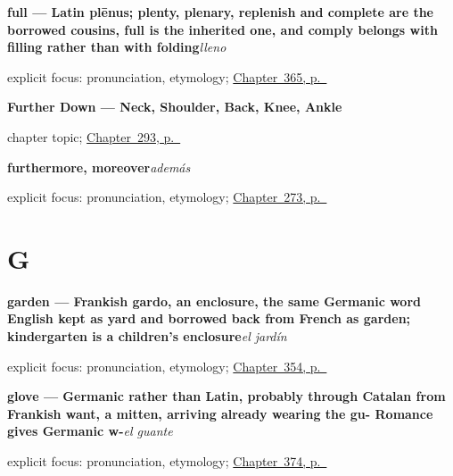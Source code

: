 \noindent\begin{minipage}[t]{\linewidth}
\raggedright
\textbf{full — Latin plēnus; plenty, plenary, replenish and complete are the borrowed cousins, full is the inherited one, and comply belongs with filling rather than with folding}\enspace\emph{lleno}\par
\footnotesize explicit focus: pronunciation, etymology; \hyperref[ch:alto-y-largo]{Chapter~365, p.~\pageref*{ch:alto-y-largo}}
\end{minipage}\par\smallskip

\noindent\begin{minipage}[t]{\linewidth}
\raggedright
\textbf{Further Down --- Neck, Shoulder, Back, Knee, Ankle}\par
\footnotesize chapter topic; \hyperref[ch:mas-del-cuerpo]{Chapter~293, p.~\pageref*{ch:mas-del-cuerpo}}
\end{minipage}\par\smallskip

\noindent\begin{minipage}[t]{\linewidth}
\raggedright
\textbf{furthermore, moreover}\enspace\emph{además}\par
\footnotesize explicit focus: pronunciation, etymology; \hyperref[ch:parrafo]{Chapter~273, p.~\pageref*{ch:parrafo}}
\end{minipage}\par\smallskip

\section*{G}

\noindent\begin{minipage}[t]{\linewidth}
\raggedright
\textbf{garden — Frankish gardo, an enclosure, the same Germanic word English kept as yard and borrowed back from French as garden; kindergarten is a children's enclosure}\enspace\emph{el jardín}\par
\footnotesize explicit focus: pronunciation, etymology; \hyperref[ch:el-hotel-y-el-cine]{Chapter~354, p.~\pageref*{ch:el-hotel-y-el-cine}}
\end{minipage}\par\smallskip

\noindent\begin{minipage}[t]{\linewidth}
\raggedright
\textbf{glove — Germanic rather than Latin, probably through Catalan from Frankish want, a mitten, arriving already wearing the gu- Romance gives Germanic w-}\enspace\emph{el guante}\par
\footnotesize explicit focus: pronunciation, etymology; \hyperref[ch:el-lapiz-y-el-cepillo]{Chapter~374, p.~\pageref*{ch:el-lapiz-y-el-cepillo}}
\end{minipage}\par\smallskip

